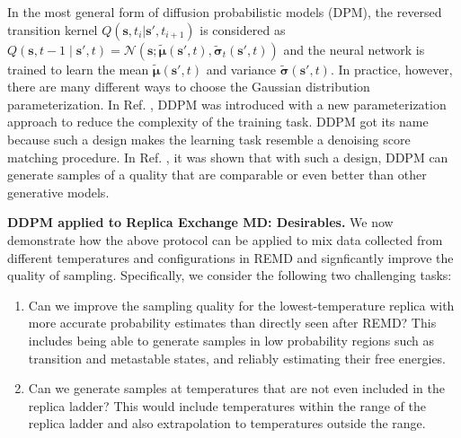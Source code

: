 \documentclass[9pt,twocolumn,twoside]{pnas-new}
\newcommand{\yh}{\textcolor{green}}
\newcommand{\onlinecite}[1]{\hspace{-1 ex} \nocite{#1}\citenum{#1}}
\begin{document}
In the most general form of diffusion probabilistic models (DPM),\cite{DPM} the reversed transition kernel $Q( \mathbf{s}, t_{i}| \mathbf{s'}, t_{i+1})$ is considered as $
Q(\mathbf{s}, t-1 \mid \mathbf{s'}, t)=\mathcal{N}(\mathbf{s} ; \tilde{\boldsymbol{\mu}}(\mathbf{s'}, t), \tilde{\boldsymbol{\sigma}}_{t}(\mathbf{s'}, t) )$ and the neural network is trained to learn the mean $\tilde{\boldsymbol{\mu}}(\mathbf{s'},t) $ and variance $\tilde{\boldsymbol{\sigma}}(\mathbf{s'}, t)$. In practice, however, there are many different ways to choose the Gaussian distribution parameterization. In Ref. \cite{denoising}, DDPM was introduced with a new parameterization approach to reduce the complexity of the training task. DDPM got its name because such a design makes the learning task resemble a denoising score matching procedure.\cite{vincent2011connection} In Ref. \onlinecite{denoising}, it was shown that with such a design, DDPM can generate samples of a quality that are comparable or even better than other generative models. 

\textbf{DDPM applied to Replica Exchange MD: Desirables.} We now demonstrate how the above protocol can be applied to mix data collected from different temperatures and configurations in REMD and signficantly improve the quality of sampling. Specifically, we consider the following two challenging tasks:
\begin{enumerate}
    \item Can we improve the sampling quality for the lowest-temperature replica with more accurate probability estimates than directly seen after REMD? This includes being able to generate samples in low probability regions such as transition and metastable states, and reliably estimating their free energies.
    \item Can we generate samples at temperatures that are not even included in the replica ladder? This would include temperatures within the range of the replica ladder and also extrapolation to temperatures outside the range.
\end{enumerate} 
\end{document}
